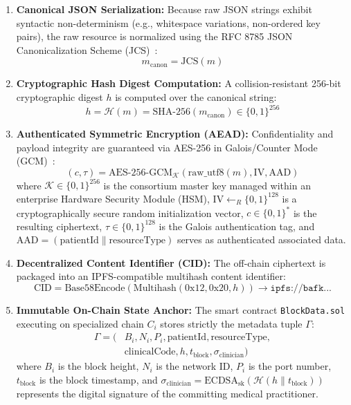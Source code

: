\begin{enumerate}
    \item \textbf{Canonical JSON Serialization:} Because raw JSON strings exhibit syntactic non-determinism (e.g., whitespace variations, non-ordered key pairs), the raw resource is normalized using the RFC 8785 JSON Canonicalization Scheme (JCS)~\cite{rundgren2020json}:
    \begin{equation}
    m_{\text{canon}} = \text{JCS}(m)
    \end{equation}
    \item \textbf{Cryptographic Hash Digest Computation:} A collision-resistant 256-bit cryptographic digest $h$ is computed over the canonical string:
    \begin{equation}
    h = \mathcal{H}(m) = \text{SHA-256}(m_{\text{canon}}) \in \{0, 1\}^{256}
    \end{equation}
    \item \textbf{Authenticated Symmetric Encryption (AEAD):} Confidentiality and payload integrity are guaranteed via AES-256 in Galois/Counter Mode (GCM)~\cite{dworkin2007recommendation, bellare2000authenticated}:
    \begin{equation}
    (c, \tau) = \text{AES-256-GCM}_{\mathcal{K}}(\text{raw\_utf8}(m), \text{IV}, \text{AAD})
    \end{equation}
    where $\mathcal{K} \in \{0, 1\}^{256}$ is the consortium master key managed within an enterprise Hardware Security Module (HSM), $\text{IV} \leftarrow_R \{0, 1\}^{128}$ is a cryptographically secure random initialization vector, $c \in \{0,1\}^*$ is the resulting ciphertext, $\tau \in \{0, 1\}^{128}$ is the Galois authentication tag, and $\text{AAD} = (\text{patientId} \parallel \text{resourceType})$ serves as authenticated associated data.
    \item \textbf{Decentralized Content Identifier (CID):} The off-chain ciphertext is packaged into an IPFS-compatible multihash content identifier:
    \begin{equation}
    \text{CID} = \text{Base58Encode}(\text{Multihash}(0\text{x}12, 0\text{x}20, h)) \rightarrow \texttt{ipfs://bafk...}
    \end{equation}
    \item \textbf{Immutable On-Chain State Anchor:} The smart contract \texttt{BlockData.sol} executing on specialized chain $C_i$ stores strictly the metadata tuple $\Gamma$:
    \begin{equation}
    \begin{aligned}
    \Gamma = (& B_i, N_i, P_i, \text{patientId}, \text{resourceType}, \\
             & \text{clinicalCode}, h, t_{\text{block}}, \sigma_{\text{clinician}} )
    \end{aligned}
    \end{equation}
    where $B_i$ is the block height, $N_i$ is the network ID, $P_i$ is the port number, $t_{\text{block}}$ is the block timestamp, and $\sigma_{\text{clinician}} = \text{ECDSA}_{\text{sk}}(\mathcal{H}(h \parallel t_{\text{block}}))$ represents the digital signature of the committing medical practitioner.
\end{enumerate}


